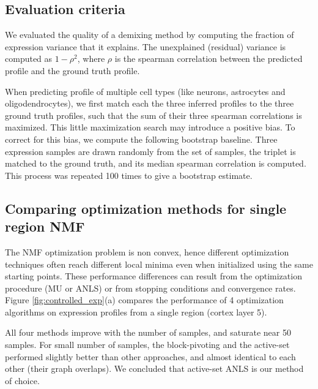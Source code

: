 \documentclass{article} %
\begin{document}


\subsection{Evaluation criteria}
\vspace{-10pt}
We evaluated the quality of a demixing method by computing the fraction of expression variance that it explains. The unexplained (residual) variance is computed as $1-\rho^2$, where $\rho$ is the spearman correlation between the predicted profile and the ground truth profile.

When predicting profile of multiple cell types (like neurons, astrocytes and oligodendrocytes), we first match each the three inferred profiles to the three ground truth profiles, such that the sum of their three spearman correlations is maximized. This little maximization search may introduce a positive bias. To correct for this bias, we compute the following bootstrap baseline. Three expression samples are drawn randomly from the set of samples, the triplet is matched to the ground truth, and its median spearman correlation is computed. This process was repeated 100 times to give a bootstrap estimate. 

\subsection{Comparing optimization methods for single region NMF}
\vspace{-10pt}
The NMF optimization problem is non convex, hence different optimization techniques often reach different local minima even when initialized using the same starting points. These performance differences can result from the optimization procedure (MU or ANLS) or from stopping conditions and convergence rates. Figure \ref{fig:controlled_exp}(a) compares the performance of 4 optimization algorithms on expression profiles from a single region (cortex layer 5). 

All four methods improve with the number of samples, and saturate near 50 samples. For small number of samples, the block-pivoting and the active-set performed slightly better than other approaches, and almost identical to each other (their graph overlaps). We concluded that active-set ANLS is our method of choice.
\end{document}

